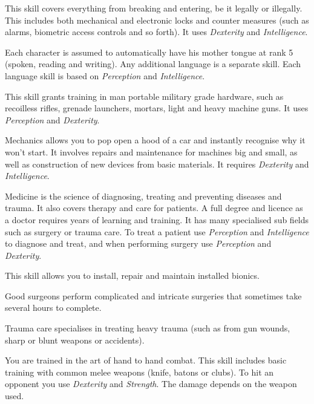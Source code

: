 \begin{description}
   This skill covers everything from breaking and entering,
  be it legally or illegally. This includes both mechanical and electronic
  locks and counter measures (such as alarms, biometric access controls and so
  forth). It uses \emph{Dexterity} and \emph{Intelligence}.

   Each character is assumed to automatically have his mother
  tongue at rank 5 (spoken, reading and writing). Any additional language is a
  separate skill. Each language skill is based on \emph{Perception} and
  \emph{Intelligence}.

   This skill grants training in man portable military
  grade hardware, such as recoilless rifles, grenade launchers, mortars, light
  and heavy machine guns. It uses \emph{Perception} and \emph{Dexterity}.

   Mechanics allows you to pop open a hood of a car and
  instantly recognise why it won't start. It involves repairs and maintenance
  for machines big and small, as well as construction of new devices
  from basic materials. It requires \emph{Dexterity} and
  \emph{Intelligence}.

   Medicine is the science of diagnosing, treating and
  preventing diseases and trauma. It also covers therapy and care for patients.
  A full degree and licence as a doctor requires years of learning and training.
  It has many specialised sub fields such as surgery or trauma care. To treat a
  patient use \emph{Perception} and \emph{Intelligence} to diagnose and treat,
  and when performing surgery use \emph{Perception} and \emph{Dexterity}.

   This skill allows you to install,
  repair and maintain installed bionics.

   Good surgeons perform complicated and
  intricate surgeries that sometimes take several hours to complete.

   Trauma care specialises in treating
  heavy trauma (such as from gun wounds, sharp or blunt weapons or accidents).

   You are trained in the art of hand to hand combat. This
  skill includes basic training with common melee weapons (knife, batons or
  clubs). To hit an opponent you use \emph{Dexterity} and \emph{Strength}.
  The damage depends on the weapon used.


\end{description}
